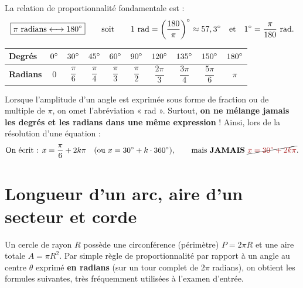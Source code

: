 \begin{theoreme}
La relation de proportionnalité fondamentale est :
\[
    \boxed{\pi \text{ radians} \longleftrightarrow 180\degree} \qquad \text{soit} \qquad 1\text{ rad} = \left(\frac{180}{\pi}\right)\degree \approx 57,3\degree \quad \text{et} \quad 1\degree = \frac{\pi}{180}\text{ rad}.
\]
\begin{center}
\renewcommand{\arraystretch}{1.4}
\begin{tabular}{@{}lccccccccc@{}}
\toprule
\textbf{Degrés} & $0\degree$ & $30\degree$ & $45\degree$ & $60\degree$ & $90\degree$ & $120\degree$ & $135\degree$ & $150\degree$ & $180\degree$ \\
\midrule
\textbf{Radians} & $0$ & $\dfrac{\pi}{6}$ & $\dfrac{\pi}{4}$ & $\dfrac{\pi}{3}$ & $\dfrac{\pi}{2}$ & $\dfrac{2\pi}{3}$ & $\dfrac{3\pi}{4}$ & $\dfrac{5\pi}{6}$ & $\pi$ \\
\bottomrule
\end{tabular}
\end{center}
\end{theoreme}

\begin{attention}
Lorsque l'amplitude d'un angle est exprimée sous forme de fraction ou de multiple de $\pi$, on omet l'abréviation « rad ». Surtout, \textbf{on ne mélange jamais les degrés et les radians dans une même expression} ! Ainsi, lors de la résolution d'une équation :
\[
    \text{On écrit : } x = \frac{\pi}{6} + 2k\pi \quad \text{(ou } x = 30\degree + k\cdot 360\degree\text{)}, \qquad \text{mais \textbf{JAMAIS} } \cancel{\textcolor{warnred}{x = 30\degree + 2k\pi}}.
\]
\end{attention}

\section{Longueur d'un arc, aire d'un secteur et corde}

Un cercle de rayon $R$ possède une circonférence (périmètre) $P = 2\pi R$ et une aire totale $A = \pi R^2$. Par simple règle de proportionnalité par rapport à un angle au centre $\theta$ exprimé \textbf{en radians} (sur un tour complet de $2\pi$ radians), on obtient les formules suivantes, très fréquemment utilisées à l'examen d'entrée.

